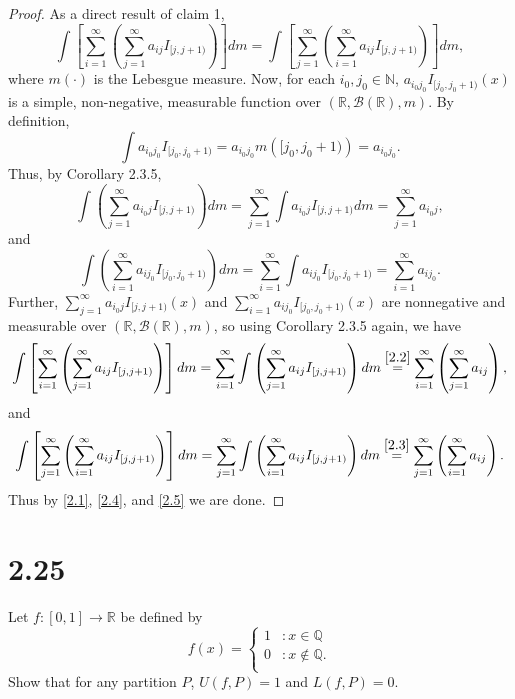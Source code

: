 \documentclass[12pt]{article}
\begin{document}
\begin{proof}
As a direct result of claim 1,
\begin{equation}
\int\left[ \sum_{i=1}^{\infty}\left( \sum_{j=1}^{\infty}a_{ij}I_{[j,j+1)} \right) \right]dm = \int\left[ \sum_{j=1}^{\infty}\left( \sum_{i=1}^{\infty}
a_{ij}I_{[j,j+1)} \right) \right]dm,
\label{2.1}
\end{equation}
where $m(\cdot)$ is the Lebesgue measure. Now, for each $i_{0}, j_{0} \in \mathbb{N}$, $a_{i_{0}j_{0}}I_{[j_{0},j_0 + 1)}(x)$ is a simple,
non-negative, measurable function over $\left( \mathbb{R}, \mathcal{B}(\mathbb{R}), m \right)$. By definition,
\[ \int a_{i_{0}j_{0}}I_{[j_{0},j_{0}+1)} = a_{i_{0}j_0}m\left( [j_{0},j_{0}+1) \right) = a_{i_{0}j_{0}}. \]
Thus, by Corollary 2.3.5,
\begin{equation}
\int\left( \sum_{j=1}^{\infty}a_{i_{0}j}I_{[j,j+1)} \right)dm = \sum_{j=1}^{\infty}\int a_{i_{0}j}I_{[j,j+1)}dm = \sum_{j=1}^{\infty}a_{i_{0}j},
\label{2.2}
\end{equation}
and 
\begin{equation}
\int\left( \sum_{i=1}^{\infty}a_{ij_{0}}I_{[j_{0},j_{0}+1)} \right)dm = \sum_{i=1}^{\infty} \int a_{ij_{0}}I_{[j_{0},j_{0}+1)} =
\sum_{i=1}^{\infty}a_{ij_{0}}.
\label{2.3}
\end{equation}
Further, $\sum_{j=1}^{\infty}a_{i_{0}j}I_{[j,j+1)}(x)$ and $\sum_{i=1}^{\infty}a_{ij_{0}}I_{[j_0,j_0+1)}(x)$ are nonnegative and measurable over
$\left( \mathbb{R}, \mathcal{B}(\mathbb{R}), m \right)$, so using Corollary 2.3.5 again, we have 
\begin{equation}
\int\left[ \sum_{i=1}^{\infty}\left( \sum_{j=1}^{\infty}a_{ij}I_{[j,j+1)} \right) \right]dm = \sum_{i=1}^{\infty}\int \left(
\sum_{j=1}^{\infty}a_{ij}I_{[j,j+1)} \right)dm \stackrel{\ref{2.2}}{=} \sum_{i=1}^{\infty}\left( \sum_{j=1}^{\infty}a_{ij} \right),
\label{2.4}
\end{equation}
and
\begin{equation}
\int\left[ \sum_{j=1}^{\infty}\left( \sum_{i=1}^{\infty}a_{ij}I_{[j,j+1)} \right) \right]dm = \sum_{j=1}^{\infty}\int\left(
\sum_{i=1}^{\infty}a_{ij}I_{[j,j+1)} \right)dm \stackrel{\ref{2.3}}{=} \sum_{j=1}^{\infty}\left( \sum_{i=1}^{\infty}a_{ij} \right).
\label{2.5}
\end{equation}
Thus by \ref{2.1}, \ref{2.4}, and \ref{2.5} we are done.
\end{proof}


\newpage
\section*{2.25}
Let $f:[0,1] \rightarrow \mathbb{R}$ be defined by 
\[ f(x) = \left\{ \begin{array}{cl}
1 & : x \in \mathbb{Q} \\
0 & : x \notin \mathbb{Q}. \\
\end{array} \right. \]
Show that for any partition $P$, $U(f,P) = 1$ and $L(f,P) = 0$.
\end{document}
